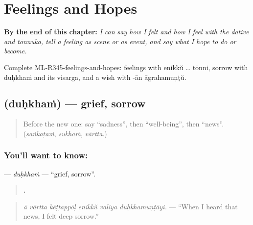
\chapter{Feelings and Hopes}
\label{ch:ml-feelings-and-hopes}

\begin{chapteropening}
\textbf{By the end of this chapter:} \emph{I can say how I felt and how I feel with the dative and tōnnuka, tell a feeling as scene or as event, and say what I hope to do or become.}

Complete ML-R345-feelings-and-hopes: feelings with enikkŭ … tōnni, sorrow with duḥkhaṁ and its visarga, and a wish with -ān āgrahamuṇṭŭ.
\end{chapteropening}

\section[\texorpdfstring{\ml{ദുഃഖം} (duḥkhaṁ)}{ദുഃഖം (duḥkhaṁ)}]{ (duḥkhaṁ) — grief, sorrow}

\label{lesson:ML-C345-duhkham}



\begin{quote}
Before the new one: say \textquotedblleft{}sadness\textquotedblright{}, then \textquotedblleft{}well-being\textquotedblright{}, then \textquotedblleft{}news\textquotedblright{}. (\emph{saṅkaṭaṁ}, \emph{sukhaṁ}, \emph{vārtta}.)
\end{quote}

\subsection*{You'll want to know: }
\textbf{} — \emph{duḥkhaṁ} — \textquotedblleft{}grief, sorrow\textquotedblright{}.

\begin{quote}
\textbf{     .}
\end{quote}

\begin{quote}
\emph{ā vārtta kēṭṭappōḷ enikkŭ valiya duḥkhamuṇṭāyi.} — \textquotedblleft{}When I heard that news, I felt deep sorrow.\textquotedblright{}
\end{quote}

